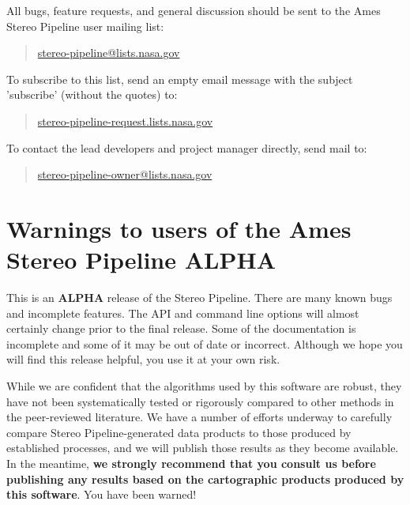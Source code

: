 All bugs, feature requests, and general discussion should be sent to
the Ames Stereo Pipeline user mailing list:
\begin{quote}
\indent \url{stereo-pipeline@lists.nasa.gov}
\end{quote}
To subscribe to this list, send an empty email message with the
subject 'subscribe' (without the quotes) to:
\begin{quote}
\indent \url{stereo-pipeline-request.lists.nasa.gov}
\end{quote}
To contact the lead developers and project manager directly, send mail
to:
\begin{quote}
\indent \url{stereo-pipeline-owner@lists.nasa.gov}
\end{quote}

\section{Warnings to users of the Ames Stereo Pipeline ALPHA}

This is an {\bf ALPHA} release of the Stereo Pipeline.  There are many
known bugs and incomplete features. The API and command line options
will almost certainly change prior to the final release.  Some of the
documentation is incomplete and some of it may be out of date or
incorrect.  Although we hope you will find this release helpful, you
use it at your own risk.

While we are confident that the algorithms used by this software are
robust, they have not been systematically tested or rigorously
compared to other methods in the peer-reviewed literature. We have a
number of efforts underway to carefully compare Stereo
Pipeline-generated data products to those produced by established
processes, and we will publish those results as they become available.
In the meantime, {\bf we strongly recommend that you consult us before
  publishing any results based on the cartographic products produced
  by this software}. You have been warned!



